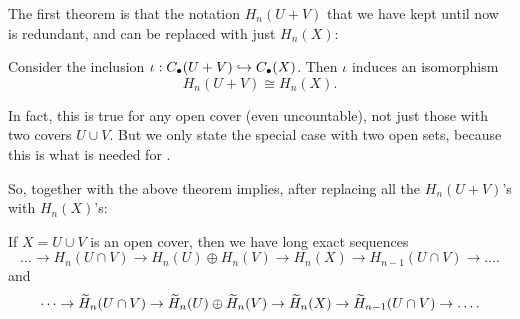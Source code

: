 The first theorem is that the notation $H_n(U+V)$ that we have kept until now
is redundant, and can be replaced with just $H_n(X)$:
\begin{theorem}
	\label{thm:open_cover_homology}
	Consider the inclusion $\iota : C_\bullet(U+V) \hookrightarrow C_\bullet(X)$.
	Then $\iota$ induces an isomorphism
	\[ H_n(U+V) \cong H_n(X). \]
\end{theorem}
\begin{remark}
	In fact, this is true for any open cover (even uncountable),
	not just those with two covers $U \cup V$.
	But we only state the special case with two open sets,
	because this is what is needed for .
\end{remark}
So,  together with the above theorem implies,
after replacing all the $H_n(U+V)$'s with $H_n(X)$'s:
\begin{theorem}
	If $X = U \cup V$ is an open cover, then we have long exact sequences
	\[ \dots \to H_n(U \cap V) \to H_n(U) \oplus H_n(V)
		\to H_n(X) \to H_{n-1}(U \cap V) \to \dots. \]
	and
	\[ \dots \to \widetilde H_n(U \cap V) \to \widetilde H_n(U) \oplus \widetilde H_n(V) \to
		\widetilde H_n(X) \to \widetilde H_{n-1}(U \cap V) \to \dots. \]
\end{theorem}

